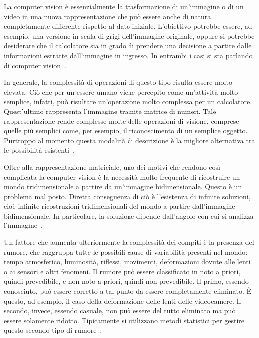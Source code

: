 				La computer vision è essenzialmente la trasformazione di un'immagine o di un video in una nuova rappresentazione che può essere anche di natura completamente differente rispetto al dato iniziale. 
				L'obiettivo potrebbe essere, ad esempio, una versione in scala di grigi dell'immagine originale, oppure si potrebbe desiderare che il calcolatore sia in grado di prendere una decisione a partire dalle informazioni estratte dall'immagine in ingresso.
				In entrambi i casi si sta parlando di computer vision~\cite{bradski2008learning}.
		
				In generale, la complessità di operazioni di questo tipo risulta essere molto elevata. 
				Ciò che per un essere umano viene percepito come un'attività molto semplice, infatti, può risultare un'operazione molto complessa per un calcolatore.
				Quest'ultimo rappresenta l'immagine tramite matrice di numeri. 
				Tale rappresentazione rende complesse molte delle operazioni di visione, comprese quelle più semplici come, per esempio, il riconoscimento di un semplice oggetto.
				Purtroppo al momento questa modalità di descrizione è la migliore alternativa tra le possibilità esistenti~\cite{bradski2008learning}.

				Oltre alla rappresentazione matriciale, uno dei motivi che rendono così complicata la computer vision è la necessità molto frequente di ricostruire un mondo tridimensionale a partire da un'immagine bidimensionale. 
				Questo è un problema mal posto. 
				Diretta conseguenza di ciò è l'esistenza di infinite soluzioni, cioè infinite ricostruzioni tridimensionali del mondo a partire dall'immagine bidimensionale.
				In particolare, la soluzione dipende dall'angolo con cui si analizza l'immagine~\cite{bradski2008learning}.

				Un fattore che aumenta ulteriormente la complessità dei compiti è la presenza del rumore, che raggruppa tutte le possibili cause di variabilità presenti nel mondo: tempo atmosferico, luminosità, riflessi, movimenti, deformazioni dovute alle lenti o ai sensori e altri fenomeni.
				Il rumore può essere classificato in noto a priori, quindi prevedibile, e non noto a priori, quindi non prevedibile. 
				Il primo, essendo conosciuto, può essere corretto a tal punto da essere completamente eliminato.
				È questo, ad esempio, il caso della deformazione delle lenti delle videocamere.
				Il secondo, invece, essendo casuale, non può essere del tutto eliminato ma può essere solamente ridotto.
				Tipicamente si utilizzano metodi statistici per gestire questo secondo tipo di rumore~\cite{bradski2008learning}. 
			 
